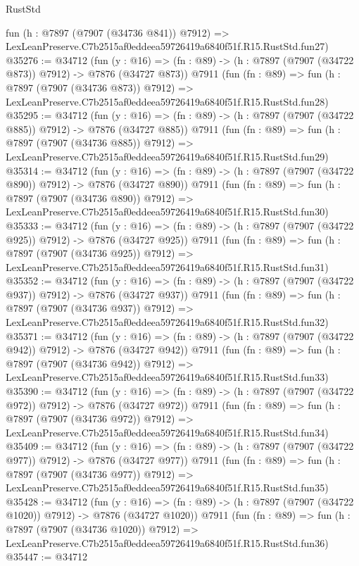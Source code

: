 \begin{lexlean}{RustStd}
\begin{coremodule}
    fun (h : @7897 (@7907 (@34736 @841)) @7912) =>
    LexLeanPreserve.C7b2515af0eddeea59726419a6840f51f.R15.RustStd.fun27)
@35276 := @34712
    (fun (y : @16) => (fn : @89) -> (h : @7897 (@7907 (@34722 @873)) @7912) -> @7876 (@34727 @873))
    @7911
    (fun (fn : @89) =>
    fun (h : @7897 (@7907 (@34736 @873)) @7912) =>
    LexLeanPreserve.C7b2515af0eddeea59726419a6840f51f.R15.RustStd.fun28)
@35295 := @34712
    (fun (y : @16) => (fn : @89) -> (h : @7897 (@7907 (@34722 @885)) @7912) -> @7876 (@34727 @885))
    @7911
    (fun (fn : @89) =>
    fun (h : @7897 (@7907 (@34736 @885)) @7912) =>
    LexLeanPreserve.C7b2515af0eddeea59726419a6840f51f.R15.RustStd.fun29)
@35314 := @34712
    (fun (y : @16) => (fn : @89) -> (h : @7897 (@7907 (@34722 @890)) @7912) -> @7876 (@34727 @890))
    @7911
    (fun (fn : @89) =>
    fun (h : @7897 (@7907 (@34736 @890)) @7912) =>
    LexLeanPreserve.C7b2515af0eddeea59726419a6840f51f.R15.RustStd.fun30)
@35333 := @34712
    (fun (y : @16) => (fn : @89) -> (h : @7897 (@7907 (@34722 @925)) @7912) -> @7876 (@34727 @925))
    @7911
    (fun (fn : @89) =>
    fun (h : @7897 (@7907 (@34736 @925)) @7912) =>
    LexLeanPreserve.C7b2515af0eddeea59726419a6840f51f.R15.RustStd.fun31)
@35352 := @34712
    (fun (y : @16) => (fn : @89) -> (h : @7897 (@7907 (@34722 @937)) @7912) -> @7876 (@34727 @937))
    @7911
    (fun (fn : @89) =>
    fun (h : @7897 (@7907 (@34736 @937)) @7912) =>
    LexLeanPreserve.C7b2515af0eddeea59726419a6840f51f.R15.RustStd.fun32)
@35371 := @34712
    (fun (y : @16) => (fn : @89) -> (h : @7897 (@7907 (@34722 @942)) @7912) -> @7876 (@34727 @942))
    @7911
    (fun (fn : @89) =>
    fun (h : @7897 (@7907 (@34736 @942)) @7912) =>
    LexLeanPreserve.C7b2515af0eddeea59726419a6840f51f.R15.RustStd.fun33)
@35390 := @34712
    (fun (y : @16) => (fn : @89) -> (h : @7897 (@7907 (@34722 @972)) @7912) -> @7876 (@34727 @972))
    @7911
    (fun (fn : @89) =>
    fun (h : @7897 (@7907 (@34736 @972)) @7912) =>
    LexLeanPreserve.C7b2515af0eddeea59726419a6840f51f.R15.RustStd.fun34)
@35409 := @34712
    (fun (y : @16) => (fn : @89) -> (h : @7897 (@7907 (@34722 @977)) @7912) -> @7876 (@34727 @977))
    @7911
    (fun (fn : @89) =>
    fun (h : @7897 (@7907 (@34736 @977)) @7912) =>
    LexLeanPreserve.C7b2515af0eddeea59726419a6840f51f.R15.RustStd.fun35)
@35428 := @34712
    (fun (y : @16) =>
    (fn : @89) -> (h : @7897 (@7907 (@34722 @1020)) @7912) -> @7876 (@34727 @1020))
    @7911
    (fun (fn : @89) =>
    fun (h : @7897 (@7907 (@34736 @1020)) @7912) =>
    LexLeanPreserve.C7b2515af0eddeea59726419a6840f51f.R15.RustStd.fun36)
@35447 := @34712

\end{coremodule}
\end{lexlean}
